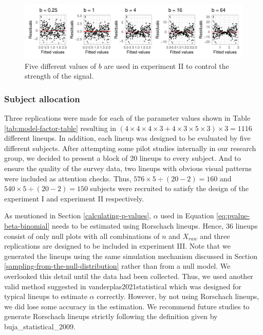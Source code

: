 \documentclass[]{interact}
\theoremstyle{plain}%
\theoremstyle{definition}
\theoremstyle{remark}
\begin{document}
\begin{figure}

{\centering \includegraphics[width=1\linewidth]{paper_comparison_files/figure-latex/different-b-1} 

}

\caption{Five different values of $b$ are used in experiment II to control the strength of the signal.}\label{fig:different-b}
\end{figure}

\hypertarget{subject-allocation}{%
\subsubsection{Subject allocation}\label{subject-allocation}}

Three replications were made for each of the parameter values shown in
Table \ref{tab:model-factor-table} resulting in
\((4 \times 4 \times 4 \times 3 + 4 \times 3 \times 5 \times 3) \times 3 = 1116\)
different lineups. In addition, each lineup was designed to be evaluated
by five different subjects. After attempting some pilot studies
internally in our research group, we decided to present a block of 20
lineups to every subject. And to ensure the quality of the survey data,
two lineups with obvious visual patterns were included as attention
checks. Thus, \(576 \times 5 \div (20-2) = 160\) and
\(540 \times 5 \div (20-2) = 150\) subjects were recruited to satisfy
the design of the experiment I and experiment II respectively.

As mentioned in Section \ref{calculating-p-values}, \(\alpha\) used in
Equation \ref{eq:pvalue-beta-binomial} needs to be estimated using
Rorschach lineups. Hence, 36 lineups consist of only null plots with all
combinations of \(n\) and \(X_{raw}\) and three replications are
designed to be included in experiment III. Note that we generated the
lineups using the same simulation mechanism discussed in Section
\ref{sampling-from-the-null-distribution} rather than from a null model.
We overlooked this detail until the data had been collected. Thus, we
used another valid method suggested in vanderplas2021statistical which
was designed for typical lineups to estimate \(\alpha\) correctly.
However, by not using Rorschach lineups, we did lose some accuracy in
the estimation. We recommend future studies to generate Rorschach
lineups strictly following the definition given by
buja\_statistical\_2009.
\end{document}
